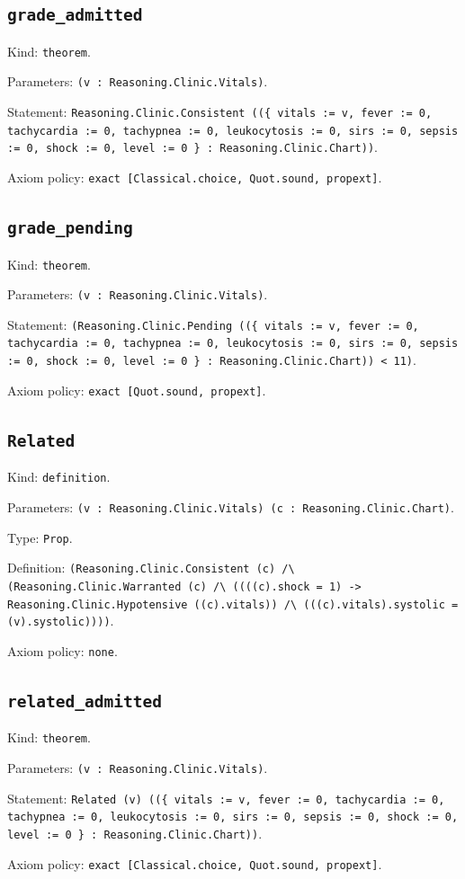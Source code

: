 \documentclass[11pt]{article}
\begin{document}
\subsection*{\texttt{grade\_admitted}}
\noindent Kind: \texttt{theorem}.\par
\noindent Parameters: \texttt{(v : Reasoning.Clinic.Vitals)}.\par
\noindent Statement: \texttt{Reasoning.Clinic.Consistent ((\{ vitals := v, fever := 0, tachycardia := 0, tachypnea := 0, leukocytosis := 0, sirs := 0, sepsis := 0, shock := 0, level := 0 \} : Reasoning.Clinic.Chart))}.\par
\noindent Axiom policy: \texttt{exact [Classical.choice, Quot.sound, propext]}.\par
\subsection*{\texttt{grade\_pending}}
\noindent Kind: \texttt{theorem}.\par
\noindent Parameters: \texttt{(v : Reasoning.Clinic.Vitals)}.\par
\noindent Statement: \texttt{(Reasoning.Clinic.Pending ((\{ vitals := v, fever := 0, tachycardia := 0, tachypnea := 0, leukocytosis := 0, sirs := 0, sepsis := 0, shock := 0, level := 0 \} : Reasoning.Clinic.Chart)) < 11)}.\par
\noindent Axiom policy: \texttt{exact [Quot.sound, propext]}.\par
\subsection*{\texttt{Related}}
\noindent Kind: \texttt{definition}.\par
\noindent Parameters: \texttt{(v : Reasoning.Clinic.Vitals) (c : Reasoning.Clinic.Chart)}.\par
\noindent Type: \texttt{Prop}.\par
\noindent Definition: \texttt{(Reasoning.Clinic.Consistent (c) /\textbackslash{} (Reasoning.Clinic.Warranted (c) /\textbackslash{} ((((c).shock = 1) -> Reasoning.Clinic.Hypotensive ((c).vitals)) /\textbackslash{} (((c).vitals).systolic = (v).systolic))))}.\par
\noindent Axiom policy: \texttt{none}.\par
\subsection*{\texttt{related\_admitted}}
\noindent Kind: \texttt{theorem}.\par
\noindent Parameters: \texttt{(v : Reasoning.Clinic.Vitals)}.\par
\noindent Statement: \texttt{Related (v) ((\{ vitals := v, fever := 0, tachycardia := 0, tachypnea := 0, leukocytosis := 0, sirs := 0, sepsis := 0, shock := 0, level := 0 \} : Reasoning.Clinic.Chart))}.\par
\noindent Axiom policy: \texttt{exact [Classical.choice, Quot.sound, propext]}.\par
\end{document}
